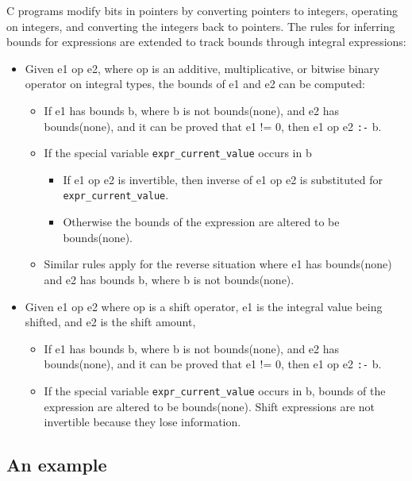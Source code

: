C programs modify bits in pointers by converting pointers to integers,
operating on integers, and converting the integers back to pointers. The
rules for inferring bounds for expressions are extended to track bounds
through integral expressions:

\begin{itemize}
\item
  Given e1 op e2, where op is an additive, multiplicative, or bitwise
  binary operator on integral types, the bounds of e1 and e2 can be
  computed:

  \begin{itemize}
  \item
    If e1 has bounds b, where b is not bounds(none), and e2 has
    bounds(none), and it can be proved that e1 != 0, then e1 op e2
    \texttt{:-} b.
  \item
    If the special variable \texttt{expr\_current\_value} occurs in b

    \begin{itemize}
    \item
      If e1 op e2 is invertible, then inverse of e1 op e2 is substituted
      for \texttt{expr\_current\_value}.
    \item
      Otherwise the bounds of the expression are altered to be
      bounds(none).
    \end{itemize}
  \item
    Similar rules apply for the reverse situation where e1 has
    bounds(none) and e2 has bounds b, where b is not bounds(none).
  \end{itemize}
\item
  Given e1 op e2 where op is a shift operator, e1 is the integral value
  being shifted, and e2 is the shift amount,

  \begin{itemize}
  \item
    If e1 has bounds b, where b is not bounds(none), and e2 has
    bounds(none), and it can be proved that e1 != 0, then e1 op e2
    \texttt{:-} b.
  \item
    If the special variable \texttt{expr\_current\_value} occurs in b,
    bounds of the expression are altered to be bounds(none). Shift
    expressions are not invertible because they lose information.
  \end{itemize}
\end{itemize}

\subsection{An example}\label{an-example-1}

